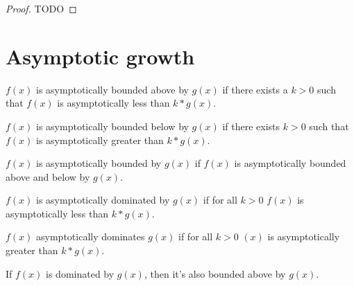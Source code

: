 \begin{proof}
    \leanok
    TODO
\end{proof}


\section{Asymptotic growth}

\begin{definition}
    \label{def:asymp_bounded_above}
    \leanok
    $f(x)$ is asymptotically bounded above by $g(x)$ if there exists a $k > 0$ 
    such that $f(x)$ is asymptotically less than $k*g(x)$.
\end{definition}

\begin{definition}
    \label{def:asymp_bounded_below}
    \leanok
    $f(x)$ is asymptotically bounded below by $g(x)$ if there exists $k > 0$ 
    such that $f(x)$ is asymptotically greater than $k*g(x)$.
\end{definition}

\begin{definition}
    \label{def:asymp_bounded}
    \leanok
    $f(x)$ is asymptotically bounded by $g(x)$ if $f(x)$ is asymptotically bounded
    above and below by $g(x)$.
\end{definition}

\begin{definition}
    \label{def:asymp_right_dom}
    \leanok
    $f(x)$ is asymptotically dominated by $g(x)$ if for all $k > 0$ $f(x)$ is asymptotically 
    less than $k*g(x)$.

\end{definition}

\begin{definition}
    \label{def:asymp_left_dom}
    \leanok
    $f(x)$ asymptotically dominates $g(x)$ if for all $k > 0$ $(x)$ is asymptotically
    greater than $k*g(x)$.

\end{definition}

\begin{lemma}
    \label{lemma:asymp_right_dom_imp_bounded_above}
    \leanok
    If $f(x)$ is dominated by $g(x)$, then it's also bounded above by $g(x)$.
\end{lemma}

